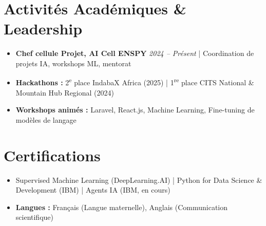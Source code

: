 \documentclass[a4paper,11pt]{article}
\begin{document}
\begin{itemize}[leftmargin=*, label={}]
\end{itemize}

\section{Activités Académiques \& Leadership}
\begin{itemize}[leftmargin=*, nosep]
    \item \small{\textbf{Chef cellule Projet, AI Cell ENSPY} \hfill \textit{2024 -- Présent} | Coordination de projets IA, workshops ML, mentorat}
    \item \small{\textbf{Hackathons :} 2\textsuperscript{e} place IndabaX Africa (2025) | 1\textsuperscript{re} place CITS National \& Mountain Hub Regional (2024)}
    \item \small{\textbf{Workshops animés :} Laravel, React.js, Machine Learning, Fine-tuning de modèles de langage}
\end{itemize}

\section{Certifications}
\begin{itemize}[leftmargin=*, nosep]
    \item \small{Supervised Machine Learning (DeepLearning.AI) | Python for Data Science \& Development (IBM) | Agents IA (IBM, en cours)}
    \item \small{\textbf{Langues :} Français (Langue maternelle), Anglais (Communication scientifique)}
\end{itemize}
\end{document}
